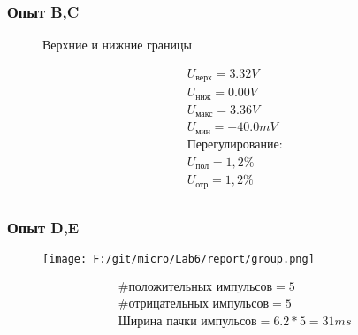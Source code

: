 \documentclass[12pt]{article} %
\begin{document}
\subsubsection*{Опыт B,C}

\begin{figure}[H]
    \begin{subfigure}
        \texttt{[image: F:/git/micro/Lab6/report/high.png]}	
    \end{subfigure}
    \hfill
    \begin{subfigure}
        \texttt{[image: F:/git/micro/Lab6/report/low.png]}	
    \end{subfigure}
    \caption{Верхние и нижние границы}
\end{figure}

\[
\begin{align}
    & U_\text{верх} = 3.32V \\
   &  U_\text{ниж} = 0.00V \\
&    U_\text{макс} = 3.36V \\
  &  U_\text{мин} = -40.0mV \\
    &\text{Перегулирование:}\\
    &U_\text{пол} = 1,2\%\\
    &U_\text{отр} = 1,2\%\\
 \end{align}
\]



\subsubsection*{Опыт D,E}

\begin{figure}[H]
    \texttt{[image: F:/git/micro/Lab6/report/group.png]}	
\end{figure}
\[ 
\begin{align}
   & \#\text{положительных импульсов} = 5\\
    &\#\text{отрицательных импульсов} = 5\\
    &\text{Ширина пачки импульсов} = 6.2*5 = 31ms\\
\end{align}
\]
\end{document}
